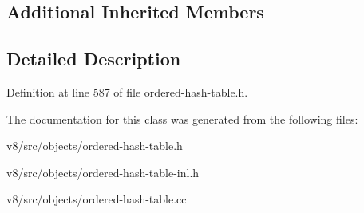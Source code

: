\subsection*{Additional Inherited Members}


\subsection{Detailed Description}


Definition at line 587 of file ordered-\/hash-\/table.\+h.



The documentation for this class was generated from the following files\+:\begin{DoxyCompactItemize}
\item 
v8/src/objects/ordered-\/hash-\/table.\+h\item 
v8/src/objects/ordered-\/hash-\/table-\/inl.\+h\item 
v8/src/objects/ordered-\/hash-\/table.\+cc\end{DoxyCompactItemize}
